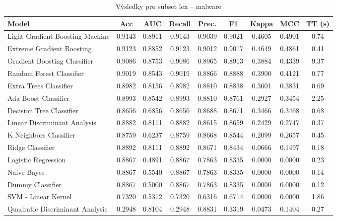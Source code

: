 \begin{table}[H]
  \centering
  \small
  \caption{Výsledky pro subset lex – malware}
  \begin{tabular}{|l|c|c|c|c|c|c|c|c|}
    \hline
    \textbf{Model} & \textbf{Acc} & \textbf{AUC} & \textbf{Recall} & \textbf{Prec.} & \textbf{F1} & \textbf{Kappa} & \textbf{MCC} & \textbf{TT (s)} \\
    \hline
    Light Gradient Boosting Machine & 0.9143 & 0.8911 & 0.9143 & 0.9039 & 0.9021 & 0.4605 & 0.4901 & 0.74 \\
    Extreme Gradient Boosting & 0.9123 & 0.8852 & 0.9123 & 0.9012 & 0.9017 & 0.4649 & 0.4861 & 0.41 \\
    Gradient Boosting Classifier & 0.9086 & 0.8753 & 0.9086 & 0.8965 & 0.8913 & 0.3884 & 0.4339 & 9.37 \\
    Random Forest Classifier & 0.9019 & 0.8543 & 0.9019 & 0.8866 & 0.8888 & 0.3900 & 0.4121 & 0.77 \\
    Extra Trees Classifier & 0.8982 & 0.8156 & 0.8982 & 0.8810 & 0.8838 & 0.3601 & 0.3831 & 0.69 \\
    Ada Boost Classifier & 0.8993 & 0.8542 & 0.8993 & 0.8810 & 0.8761 & 0.2927 & 0.3454 & 2.25 \\
    Decision Tree Classifier & 0.8656 & 0.6856 & 0.8656 & 0.8688 & 0.8671 & 0.3466 & 0.3468 & 0.68 \\
    Linear Discriminant Analysis & 0.8882 & 0.8111 & 0.8882 & 0.8615 & 0.8659 & 0.2429 & 0.2747 & 0.37 \\
    K Neighbors Classifier & 0.8759 & 0.6237 & 0.8759 & 0.8668 & 0.8544 & 0.2099 & 0.2657 & 0.45 \\
    Ridge Classifier & 0.8892 & 0.8111 & 0.8892 & 0.8671 & 0.8434 & 0.0666 & 0.1497 & 0.18 \\
    Logistic Regression & 0.8867 & 0.4891 & 0.8867 & 0.7863 & 0.8335 & 0.0000 & 0.0000 & 0.23 \\
    Naive Bayes & 0.8867 & 0.5540 & 0.8867 & 0.7863 & 0.8335 & 0.0000 & 0.0000 & 0.14 \\
    Dummy Classifier & 0.8867 & 0.5000 & 0.8867 & 0.7863 & 0.8335 & 0.0000 & 0.0000 & 0.12 \\
    SVM - Linear Kernel & 0.7320 & 0.5312 & 0.7320 & 0.6316 & 0.6714 & 0.0000 & 0.0000 & 1.86 \\
    Quadratic Discriminant Analysis & 0.2948 & 0.8104 & 0.2948 & 0.8831 & 0.3319 & 0.0473 & 0.1404 & 0.27 \\
    \hline
  \end{tabular}
\end{table}
\vspace{0.5cm}

